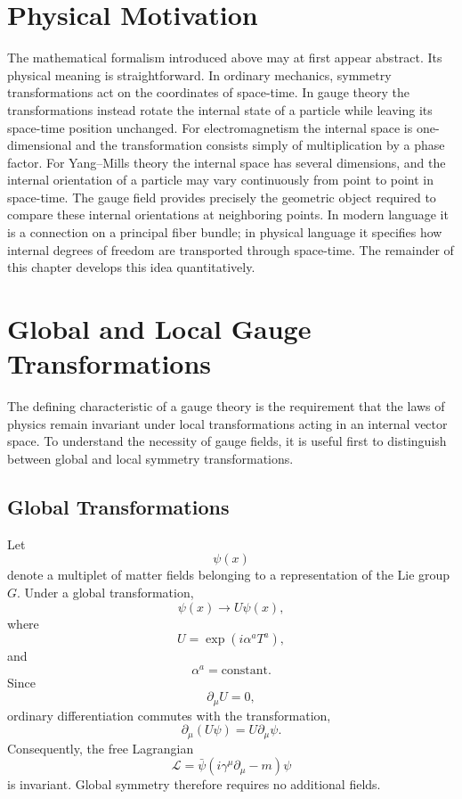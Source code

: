 \section{Physical Motivation}
The mathematical formalism introduced above may at first appear
abstract. Its physical meaning is straightforward.
In ordinary mechanics, symmetry transformations act on the coordinates
of space-time. In gauge theory the transformations instead rotate the
internal state of a particle while leaving its space-time position
unchanged.
For electromagnetism the internal space is one-dimensional and the
transformation consists simply of multiplication by a phase factor.
For Yang--Mills theory the internal space has several dimensions, and
the internal orientation of a particle may vary continuously from point
to point in space-time.
The gauge field provides precisely the geometric object required to
compare these internal orientations at neighboring points. In modern
language it is a connection on a principal fiber bundle; in physical
language it specifies how internal degrees of freedom are transported
through space-time.
The remainder of this chapter develops this idea quantitatively.
\section{Global and Local Gauge Transformations}
The defining characteristic of a gauge theory is the requirement that
the laws of physics remain invariant under local transformations acting
in an internal vector space.
To understand the necessity of gauge fields, it is useful first to
distinguish between global and local symmetry transformations.
\subsection{Global Transformations}
Let
\[\psi(x)\]
denote a multiplet of matter fields belonging to a representation of the
Lie group \(G\).
Under a global transformation,
\[\boxed{\psi(x)\rightarrow U\psi(x),}\]
where
\[U=\exp(i\alpha^aT^a),\]
and
\[\alpha^a=\text{constant}.\]
Since
\[\partial_\mu U=0,\]
ordinary differentiation commutes with the transformation,
\[\partial_\mu(U\psi)=U\partial_\mu\psi.\]
Consequently,
the free Lagrangian
\[\mathcal L=\bar\psi(i\gamma^\mu\partial_\mu-m)\psi\]
is invariant.
Global symmetry therefore requires no additional fields.
